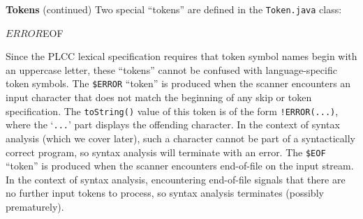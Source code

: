 \begin{minipage}[t]{\sw}
\slidenumber
\LARGE
{\bf Tokens} (continued)\exx
Two special ``tokens'' are defined
in the \verb'Token.java' class:
\begin{qv}
$ERROR
$EOF
\end{qv}
Since the PLCC lexical specification requires that token symbol names
begin with an uppercase letter,
these ``tokens'' cannot be confused
with language-specific token symbols.\exx
The \verb'$ERROR' ``token'' is produced
when the scanner encounters an input character
that does not match the beginning
of any skip or token specification.
The \verb'toString()' value of this token
is of the form \verb'!ERROR(...)',
where the `\verb'...'' part
displays the offending character.
In the context of syntax analysis (which we cover later),
such a character cannot
be part of a syntactically correct program,
so syntax analysis will terminate with an error.\exx
The \verb'$EOF' ``token'' is produced
when the scanner encounters end-of-file on the input stream.
In the context of syntax analysis,
encountering end-of-file signals
that there are no further input tokens to process,
so syntax analysis terminates
(possibly prematurely).
\end{minipage}
\clearpage
